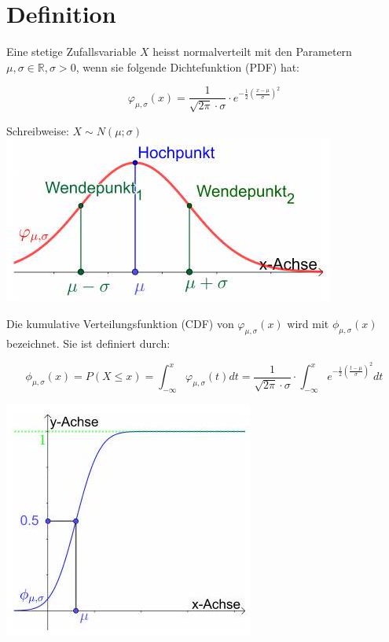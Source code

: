 \documentclass[10pt]{article}
\begin{document}
\section*{Definition}
Eine stetige Zufallsvariable $X$ heisst normalverteilt mit den Parametern $\mu, \sigma \in \mathbb{R}, \sigma>0$, wenn sie folgende Dichtefunktion (PDF) hat:

$$
\varphi_{\mu, \sigma}(x)=\frac{1}{\sqrt{2 \pi} \cdot \sigma} \cdot e^{-\frac{1}{2}\left(\frac{x-\mu}{\sigma}\right)^{2}}
$$

Schreibweise: $X \sim N(\mu ; \sigma)$\\
\includegraphics[width=\linewidth]{images/2025_01_02_c6e65a99bfeab7c89599g-3(1)}

Die kumulative Verteilungsfunktion (CDF) von $\varphi_{\mu, \sigma}(x)$ wird mit $\phi_{\mu, \sigma}(x)$ bezeichnet. Sie ist definiert durch:

$$
\phi_{\mu, \sigma}(x)=P(X \leq x)=\int_{-\infty}^{x} \varphi_{\mu, \sigma}(t) d t=\frac{1}{\sqrt{2 \pi} \cdot \sigma} \cdot \int_{-\infty}^{x} e^{-\frac{1}{2}\left(\frac{t-\mu}{\sigma}\right)^{2}} d t
$$

\begin{center}
\includegraphics[width=\linewidth]{2025_01_02_c6e65a99bfeab7c89599g-3}
\end{center}
\end{document}
